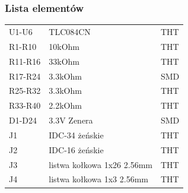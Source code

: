\documentclass{article}
\begin{document}
\subsubsection{Lista elementów}
\begin{table}[H]
	\centering
	\label{Bill of materials}
\begin{tabular}{lll}
U1-U6		&	TLC084CN			&	THT	\\
R1-R10		&	10kOhm				&	THT	\\
R11-R16		&	33kOhm				&	THT	\\
R17-R24		&	3.3kOhm				&	SMD	\\
R25-R32		&	3.3kOhm				&	THT	\\
R33-R40		&	2.2kOhm				&	THT	\\
D1-D24		&	3.3V Zenera			&	SMD	\\
J1		&	IDC-34 żeńskie			&	THT	\\
J2		&	IDC-16 żeńskie			&	THT	\\
J3		&	listwa kołkowa 1x26 2.56mm	&	THT	\\
J4		&	listwa kołkowa 1x3 2.56mm	&	THT	\\
\end{tabular}
\end{table}
\end{document}
